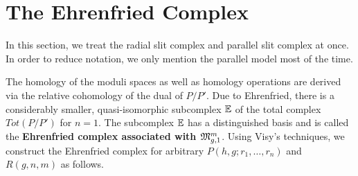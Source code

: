 \section{The Ehrenfried Complex}
\label{cellular_models:ehrenfried}
In this section, we treat the radial slit complex and parallel slit complex at once.
In order to reduce notation, we only mention the parallel model most of the time.

The homology of the moduli spaces as well as homology operations are derived via the relative cohomology of the dual of $P/P'$.
Due to Ehrenfried, there is a considerably smaller, quasi-isomorphic subcomplex $\E$ of the total complex $Tot(P/P')$ for $n=1$.
The subcomplex $\E$ has a distinguished basis and is called the {\bf Ehrenfried complex associated with $\Modspc[1]$}.
Using Visy's techniques, we construct the Ehrenfried complex for arbitrary $P(h,g;r_1, \ldots, r_n)$ and $R(g,n,m)$ as follows.



